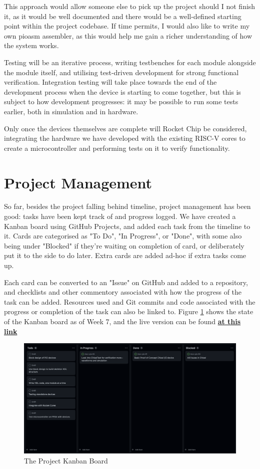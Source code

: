 \documentclass[a4paper,fleqn,12pt]{article}
\begin{document}
This approach would allow someone else to pick up the project should I not finish it, as it would be well documented and there would be a well-defined starting point within the project codebase. If time permits, I would also like to write my own pioasm assembler, as this would help me gain a richer understanding of how the system works.

Testing will be an iterative process, writing testbenches for each module alongside the module itself, and utilising test-driven development for strong functional verification. Integration testing will take place towards the end of the development process when the device is starting to come together, but this is subject to how development progresses: it may be possible to run some tests earlier, both in simulation and in hardware.

Only once the devices themselves are complete will Rocket Chip be considered, integrating the hardware we have developed with the existing RISC-V cores to create a microcontroller and performing tests on it to verify functionality.

\section{Project Management}

So far, besides the project falling behind timeline, project management has been good: tasks have been kept track of and progress logged. We have created a Kanban board using GitHub Projects, and added each task from the timeline to it. Cards are categorised as "To Do", "In Progress", or "Done", with some also being under "Blocked" if they're waiting on completion of card, or deliberately put it to the side to do later. Extra cards are added ad-hoc if extra tasks come up.

Each card can be converted to an "Issue" on GitHub and added to a repository, and checklists and other commentory associated with how the progress of the task can be added. Resources used and Git commits and code associated with the progress or completion of the task can also be linked to. Figure \ref{fig:kanban} shows the state of the Kanban board as of Week 7, and the live version can be found \href{https://github.com/users/Joeyh021/projects/2}{\textbf{at this link}}

\begin{figure}[h!]
	\centering
	\includegraphics[width=\textwidth]{../img/kanban-wk6.png}
	\caption{The Project Kanban Board}
	\label{fig:kanban}
\end{figure}
\end{document}
